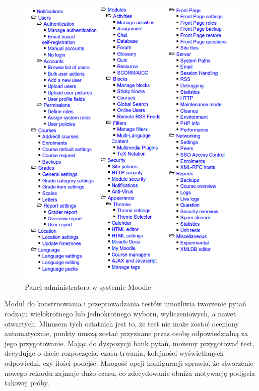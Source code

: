 \documentclass[12pt,twoside]{report}
\begin{document}
\begin{figure}[ht]
  \begin{center}
    \includegraphics[width=1\linewidth]{images/moodle_panel.png}
  \end{center}
  \caption{Panel administratora w systemie Moodle}
  \label{fig:moodle_panel}
\end{figure}


Moduł do konstruowania i przeprowadzania testów umożliwia tworzenie pytań rodzaju
wielokrotnego lub jednokrotnego wyboru, wyliczeniowych, a nawet otwartych. Minusem tych
ostatnich jest to, że test nie może zostać oceniony automatycznie, punkty muszą zostać
przyznane przez osobę odpowiedzialną za jego przygotowanie. Mając do dyspozycji bank
pytań, możemy przygotować test, decydując o dacie rozpoczęcia, czasu trwania, kolejności
wyświetlanych odpowiedzi, czy ilości podejść. Mnogość opcji konfiguracji sprawia, że
stworzenie nowego rekordu zajmuje dużo czasu, co zdecydowanie obniża motywację podjęcia
takowej próby.
\end{document}
